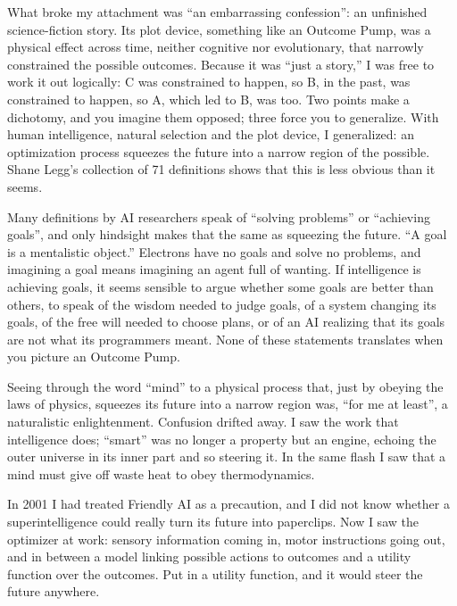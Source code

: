 What broke my attachment was ``an embarrassing confession'': an unfinished science-fiction story. Its plot device, something like an Outcome Pump, was a physical effect across time, neither cognitive nor evolutionary, that narrowly constrained the possible outcomes. Because it was ``just a story,'' I was free to work it out logically: C was constrained to happen, so B, in the past, was constrained to happen, so A, which led to B, was too. Two points make a dichotomy, and you imagine them opposed; three force you to generalize. With human intelligence, natural selection and the plot device, I generalized: an optimization process squeezes the future into a narrow region of the possible. Shane Legg's collection of 71 definitions shows that this is less obvious than it seems. 

Many definitions by AI researchers speak of ``solving problems'' or ``achieving goals'', and only hindsight makes that the same as squeezing the future. ``A goal is a mentalistic object.'' Electrons have no goals and solve no problems, and imagining a goal means imagining an agent full of wanting.  If intelligence is achieving goals, it seems sensible to argue whether some goals are better than others, to speak of the wisdom needed to judge goals, of a system changing its goals, of the free will needed to choose plans, or of an AI realizing that its goals are not what its programmers meant. None of these statements translates when you picture an Outcome Pump.

Seeing through the word ``mind'' to a physical process that, just by obeying the laws of physics, squeezes its future into a narrow region was, ``for me at least'', a naturalistic enlightenment. Confusion drifted away. I saw the work that intelligence does; ``smart'' was no longer a property but an engine, echoing the outer universe in its inner part and so steering it. In the same flash I saw that a mind must give off waste heat to obey thermodynamics.

In 2001 I had treated Friendly AI as a precaution, and I did not know whether a superintelligence could really turn its future into paperclips.  Now I saw the optimizer at work: sensory information coming in, motor instructions going out, and in between a model linking possible actions to outcomes and a utility function over the outcomes. Put in a utility function, and it would steer the future anywhere.

